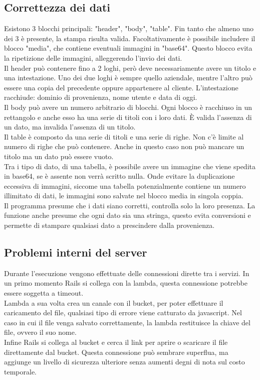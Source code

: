 \documentclass[12pt]{article}
\begin{document}
\subsection{Correttezza dei dati}
Esistono 3 blocchi principali: "header", "body", "table".
Fin tanto che almeno uno dei 3 è presente, la stampa risulta valida.
Facoltativamente è possibile includere il blocco "media", che contiene 
eventuali immagini in "base64". Questo blocco evita la ripetizione delle immagini, 
alleggerendo l'invio dei dati.
\\ Il header può contenere fino a 2 loghi, però deve necessariamente avere 
un titolo e una intestazione. 
Uno dei due loghi è sempre quello aziendale, mentre l'altro può essere una copia 
del precedente oppure appartenere al cliente.
L'intestazione racchiude: dominio di provenienza, nome utente e data di oggi.
\\ Il body può avere un numero arbitrario di blocchi. Ogni blocco è racchiuso 
in un rettangolo e anche esso ha una serie di titoli con i loro dati. 
È valida l'assenza di un dato, ma invalida l'assenza di un titolo. 
\\ Il table è composto da una serie di titoli e una serie di righe. Non c'è limite 
al numero di righe che può contenere.
Anche in questo caso non può mancare un titolo ma un dato può essere vuoto. 
\\ Tra i tipo di dato, di una tabella, 
è possibile avere un immagine che viene spedita in 
base64, se è assente non verrà scritto nulla. Onde evitare la duplicazione 
eccessiva di immagini, siccome una tabella potenzialmente contiene un numero 
illimitato di dati, le immagini sono salvate nel blocco media in singola coppia. 
\\ Il programma presume che i dati siano corretti, controlla solo la loro presenza.
La funzione anche presume che ogni dato sia una stringa, questo evita conversioni 
e permette di stampare qualsiasi dato a prescindere dalla provenienza.

\subsection{Problemi interni del server}
Durante l'esecuzione vengono effettuate delle connessioni dirette tra i servizi. 
In un primo momento Rails si collega con la lambda, questa connessione potrebbe 
essere soggetta a timeout. 
\\ Lambda a sua volta crea un canale con il bucket, per poter 
effettuare il caricamento del file, qualsiasi tipo di errore viene catturato da javascript.
Nel caso in cui il file venga salvato correttamente,
la lambda restituisce la chiave del file, ovvero il suo nome. 
\\ Infine Rails si collega al bucket e cerca il link per aprire o scaricare il file 
direttamente dal bucket.
Questa connessione può sembrare superflua, ma aggiunge 
un livello di sicurezza ulteriore senza aumenti degni di nota sul costo temporale. 
\end{document}
